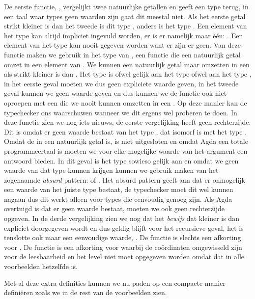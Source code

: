 De eerste functie, , vergelijkt twee natuurlijke getallen en geeft
een type terug, in een taal waar types geen waarden zijn gaat dit meestal niet.
Als het eerste getal strikt kleiner is dan het tweede is dit type ,
anders is het type . Een element van het type  kan altijd
impliciet ingevuld worden, er is er namelijk maar één: . Een element
van het type  kan nooit gegeven worden want er zijn er geen.  Van deze
functie maken we gebruik in het type van , een functie die een
natuurlijk getal omzet in een element van . We kunnen een
natuurlijk getal  maar omzetten in een  als 
strikt kleiner is dan . Het type  is ofwel gelijk aan
het type  ofwel aan het type , in het eerste geval moeten we
dus geen expliciete waarde geven, in het tweede geval kunnen we geen waarde
geven en dus kunnen we de functie ook niet oproepen met een  die we
nooit kunnen omzetten in een . Op deze manier kan de typechecker
ons waarschuwen wanneer we dit ergens wel proberen te doen. In deze functie
zien we nog iets nieuws, de eerste vergelijking heeft geen rechterzijde. Dit is
omdat er geen waarde bestaat van het type , dat isomorf is met het
type . Omdat de  in  een natuurlijk getal is, is
 niet uitgesloten en omdat Agda een totale programmeertaal is moeten
we voor elke mogelijke waarde van het argument  een antwoord bieden.
In dit geval is het type  sowieso gelijk aan  en omdat
we geen waarde van dat type kunnen krijgen kunnen we gebruik maken van het
zogenaamde \emph{absurd} pattern: \iagda{{}} of \iagda{()}. Het absurd pattern
geeft aan dat er onmogelijk een waarde van het juiste type bestaat, de
typechecker moet dit wel kunnen nagaan dus dit werkt alleen voor types die
eenvoudig genoeg zijn. Als Agda overtuigd is dat er geen waarde bestaat, moeten
we ook geen rechterzijde opgeven. In de derde vergelijking zien we nog dat het
\emph{bewijs} dat  kleiner is dan  expliciet doorgegeven
wordt en dus geldig blijft voor het recursieve geval, het is tenslotte ook maar
een eenvoudige waarde, . De functie  is slechts een
afkorting voor . De functie  is een afkorting voor
 waarbij de coördinaten omgewisseld zijn voor de leesbaarheid en
het level niet moet opgegeven worden omdat dat in alle voorbeelden hetzelfde
is.

Met al deze extra definities kunnen we nu paden op een compacte manier
definiëren zoals we in de rest van de voorbeelden zien.

